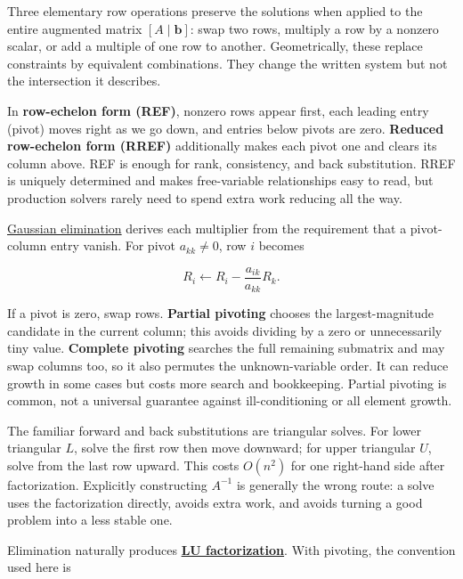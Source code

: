 \hypertarget{01-foundations-i-ch019-elimination-turns-the-geometry-into-an-auditable-calculation}{}

Three elementary row operations preserve the solutions when applied to the entire augmented matrix \([A\mid\mathbf b]\): swap two rows, multiply a row by a nonzero scalar, or add a multiple of one row to another. Geometrically, these replace constraints by equivalent combinations. They change the written system but not the intersection it describes.

In \textbf{row-echelon form (REF)}, nonzero rows appear first, each leading entry (pivot) moves right as we go down, and entries below pivots are zero. \textbf{Reduced row-echelon form (RREF)} additionally makes each pivot one and clears its column above. REF is enough for rank, consistency, and back substitution. RREF is uniquely determined and makes free-variable relationships easy to read, but production solvers rarely need to spend extra work reducing all the way.

\hyperref[01-foundations-i-ch019-elimination-turns-the-geometry-into-an-auditable-calculation]{Gaussian elimination} derives each multiplier from the requirement that a pivot-column entry vanish. For pivot \(a_{kk}\ne0\), row \(i\) becomes

\[
R_i\leftarrow R_i-\frac{a_{ik}}{a_{kk}}R_k.
\]

If a pivot is zero, swap rows. \textbf{Partial pivoting} chooses the largest-magnitude candidate in the current column; this avoids dividing by a zero or unnecessarily tiny value. \textbf{Complete pivoting} searches the full remaining submatrix and may swap columns too, so it also permutes the unknown-variable order. It can reduce growth in some cases but costs more search and bookkeeping. Partial pivoting is common, not a universal guarantee against ill-conditioning or all element growth.

The familiar forward and back substitutions are triangular solves. For lower triangular \(L\), solve the first row then move downward; for upper triangular \(U\), solve from the last row upward. This costs \(O(n^2)\) for one right-hand side after factorization. Explicitly constructing \(A^{-1}\) is generally the wrong route: a solve uses the factorization directly, avoids extra work, and avoids turning a good problem into a less stable one.

Elimination naturally produces \textbf{\hyperref[01-foundations-i-ch019-a-runnable-pivoted-lu-reference-preserves-the-elimination-history]{LU factorization}}. With pivoting, the convention used here is

